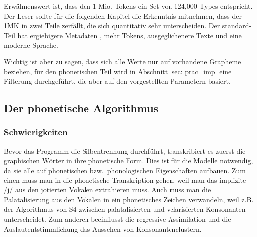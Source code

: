 \documentclass[12pt,headsepline,a4paper]{scrartcl}
\begin{document}
Erwähnenswert ist, dass den 1 Mio. Tokens ein Set von 124,000 Types entspricht. Der Leser sollte für die folgenden Kapitel die Erkenntnis mitnehmen, dass der 1MK in zwei Teile zerfällt, die sich quantitativ sehr unterscheiden. Der standard-Teil hat ergiebigere Metadaten , mehr Tokens, ausgeglichenere Texte und eine moderne Sprache.

% 

Wichtig ist aber zu sagen, dass sich alle Werte nur auf vorhandene Grapheme beziehen, für den phonetischen Teil wird in Abschnitt \ref{sec: prac_imp} eine Filterung durchgeführt, die aber auf den vorgestellten Parametern basiert.

\subsection{Der phonetische Algorithmus}
\label{sec:phon_alg}

\subsubsection{Schwierigkeiten}
Bevor das Programm die Silbentrennung durchführt, transkribiert es zuerst die graphischen Wörter in ihre phonetische Form. Dies ist für die Modelle notwendig, da sie alle auf phonetischen bzw.\ phonologischen Eigenschaften aufbauen. Zum einen muss man in die phonetische Transkription gehen, weil man das implizite /j/ aus den jotierten Vokalen extrahieren muss. Auch muss man die Palatalisierung aus den Vokalen in ein phonetisches Zeichen verwandeln, weil z.B. der Algorithmus von S4 zwischen palatalisierten und velarisierten Konsonanten unterscheidet. Zum anderen beeinflusst die regressive Assimilation und die Auslautentstimmlichung das Aussehen von Konsonantenclustern.
\end{document}
